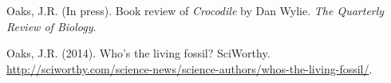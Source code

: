 \myHangIndent
Oaks, J.R.
(In press).
Book review of \emph{Crocodile} by Dan Wylie.
\emph{The Quarterly Review of Biology}.

\myHangIndent
Oaks, J.R.
(2014).
Who's the living fossil?
SciWorthy.
\href{http://sciworthy.com/science-news/science-authors/whos-the-living-fossil/}{
    http://sciworthy.com/\allowbreak{}science-news/\allowbreak{}science-authors/\allowbreak{}whos-the-living-fossil/}.

